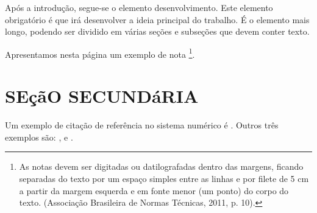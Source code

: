 \documentclass[
  oneside, %
  english,
  brazil
]{abntbibufjf}
\begin{document}
Após a introdução, segue-se o elemento desenvolvimento. Este elemento obrigatório é que irá desenvolver a ideia principal do trabalho.
É o elemento mais longo, podendo ser dividido em várias seções %
e subseções que devem conter texto.

Apresentamos nesta página um exemplo de nota \footnote{As notas devem ser digitadas ou datilografadas dentro das margens, ficando separadas do texto
  por um espaço simples entre as linhas e por filete de 5 cm a partir da margem esquerda e em fonte menor (um ponto) do corpo do texto. (Associação
  Brasileira de Normas Técnicas, 2011, p. 10).}.




\section{SEçãO SECUNDáRIA} %

Um exemplo de citação de referência no sistema numérico é \cite{disp2019}. Outros três exemplos são: \cite{Bauman99}, \cite{vet18} e
\cite{Aguiar2009}.







\end{document}

